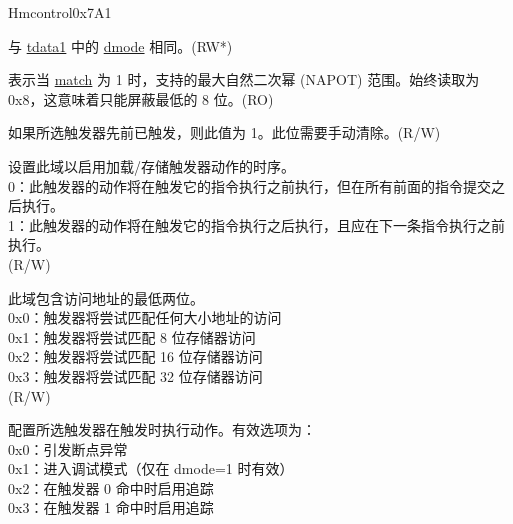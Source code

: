 \begin{register}{H}{mcontrol}{0x7A1}\label{regdesc:MCONTROL}
%
%
%
%
%
%
%
%
%
%
%
%
%
%
%
%
\regnewline%
\begin{regdesc}\begin{reglist}
\label{fielddesc:MCONTROLDMODE}\item [dmode] 与 \hyperref[regdesc:TDATA1]{tdata1} 中的 \hyperref[fielddesc:TDATA1DMODE]{dmode} 相同。(RW*)
\label{fielddesc:MCONTROLMASKMAX}\item [maskmax] 表示当 \hyperref[fielddesc:MCONTROLMATCH]{match} 为 1 时，支持的最大自然二次幂 (NAPOT) 范围。始终读取为 0x8，这意味着只能屏蔽最低的 8 位。(RO)
\label{fielddesc:MCONTROLHIT}\item [hit] 如果所选触发器先前已触发，则此值为 1。此位需要手动清除。(R/W)
\label{fielddesc:MCONTROLTIMING}\item [timing] 设置此域以启用加载/存储触发器动作的时序。\\
0：此触发器的动作将在触发它的指令执行之前执行，但在所有前面的指令提交之后执行。\\
1：此触发器的动作将在触发它的指令执行之后执行，且应在下一条指令执行之前执行。\\
(R/W)
\label{fielddesc:MCONTROLSIZELO}\item [sizelo] 此域包含访问地址的最低两位。\\
0x0：触发器将尝试匹配任何大小地址的访问\\
0x1：触发器将尝试匹配 8 位存储器访问\\
0x2：触发器将尝试匹配 16 位存储器访问\\
0x3：触发器将尝试匹配 32 位存储器访问\\
(R/W)
\label{fielddesc:MCONTROLACTION}\item [action] 配置所选触发器在触发时执行动作。有效选项为：\\
0x0：引发断点异常\\
0x1：进入调试模式（仅在 dmode=1 时有效）\\
0x2：在触发器 0 命中时启用追踪\\
0x3：在触发器 1 命中时启用追踪\\

\end{reglist}
\end{regdesc}
\end{register}
